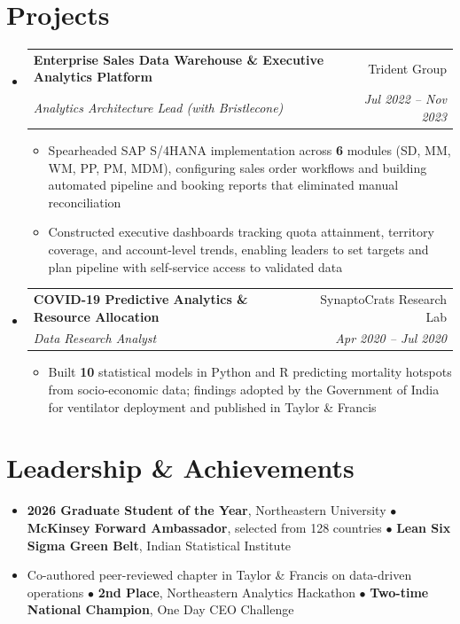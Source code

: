 \documentclass[letterpaper,10pt]{article}
\makeatletter
\newcommand{\resumeSubheading}[4]{
  \vspace{1pt}\item
    \begin{tabular*}{0.97\textwidth}[t]{l@{\extracolsep{\fill}}r}
      \textbf{#1} & #2 \\
      \textit{\small#3} & \textit{\small #4} \\
    \end{tabular*}\vspace{-4pt}
}
\newcommand{\resumeItem}[1]{\item\small{{#1 \vspace{-1pt}}}}
\newcommand{\resumeItemListStart}{\begin{itemize}[leftmargin=0.15in, label=$\bullet$]}
\newcommand{\resumeItemListEnd}{\end{itemize}\vspace{-2pt}}
\newcommand{\resumeSubHeadingListStart}{\begin{itemize}[leftmargin=0.15in, label={}]}
\newcommand{\resumeSubHeadingListEnd}{\end{itemize}}
\makeatother
\begin{document}
\section{Projects}
\resumeSubHeadingListStart
\resumeSubheading
{Enterprise Sales Data Warehouse \& Executive Analytics Platform}{Trident Group}
{Analytics Architecture Lead (with Bristlecone)}{Jul 2022 -- Nov 2023}
\resumeItemListStart
\resumeItem{Spearheaded SAP S/4HANA implementation across \textbf{6} modules (SD, MM, WM, PP, PM, MDM), configuring sales order workflows and building automated pipeline and booking reports that eliminated manual reconciliation}
\resumeItem{Constructed executive dashboards tracking quota attainment, territory coverage, and account-level trends, enabling leaders to set targets and plan pipeline with self-service access to validated data}
\resumeItemListEnd
\resumeSubheading
{COVID-19 Predictive Analytics \& Resource Allocation}{SynaptoCrats Research Lab}
{Data Research Analyst}{Apr 2020 -- Jul 2020}
\resumeItemListStart
\resumeItem{Built \textbf{10} statistical models in Python and R predicting mortality hotspots from socio-economic data; findings adopted by the Government of India for ventilator deployment and published in Taylor \& Francis}
\resumeItemListEnd
\resumeSubHeadingListEnd

\section{Leadership \& Achievements}
\resumeItemListStart
\resumeItem{\textbf{2026 Graduate Student of the Year}, Northeastern University $\bullet$ \textbf{McKinsey Forward Ambassador}, selected from 128 countries $\bullet$ \textbf{Lean Six Sigma Green Belt}, Indian Statistical Institute}
\resumeItem{Co-authored peer-reviewed chapter in Taylor \& Francis on data-driven operations $\bullet$ \textbf{2nd Place}, Northeastern Analytics Hackathon $\bullet$ \textbf{Two-time National Champion}, One Day CEO Challenge}
\resumeItemListEnd
\end{document}
